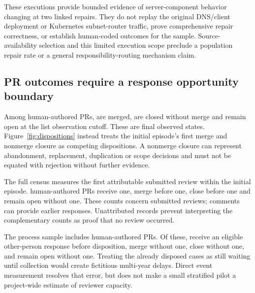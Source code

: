 \documentclass[11pt]{article}
\begin{document}
\begin{table}[htb]
\centering\small
\caption{Component regression oracles on official parent and repair commits.
Failure means the specified expected behavior was violated. The two control
results in each row correspond to parent and repair; both pass.}
\label{tab:repairvalidation}
\end{table}

These executions provide bounded evidence of server-component behavior changing
at two linked repairs. They do not replay the original DNS/client deployment
or Kubernetes subnet-router traffic, prove comprehensive repair correctness,
or establish human-coded outcomes for the sample. Source-availability selection
and this limited execution scope preclude a population repair rate or a general
responsibility-routing mechanism claim.

\subsection{PR outcomes require a response opportunity boundary}
Among human-authored PRs, \HumanPRMerged{} are merged,
\HumanPRUnmergedClosed{} are closed without merge and \HumanPROpen{} remain
open at the list observation cutoff. These are final observed states.
Figure~\ref{fig:dispositions} instead treats the initial episode's first merge
and nonmerge closure as competing dispositions. A nonmerge closure can represent
abandonment, replacement, duplication or scope decisions and must not be equated
with rejection without further evidence.

The full census measures the first attributable submitted review within the
initial episode. \FirstFormalReviewCount{} human-authored PRs receive one,
\FirstFormalMergeNoReview{} merge before one, \FirstFormalCloseNoReview{}
close before one and \FirstFormalOpenNoReview{} remain open without one.
These counts concern submitted reviews; comments can provide earlier responses.
Unattributed records prevent interpreting the complementary counts as proof that
no review occurred.

The process sample includes \PilotHumanPRCount{} human-authored PRs. Of these,
\PilotResponseCount{} receive an eligible other-person response before disposition,
\PilotMergeNoResponse{} merge without one, \PilotCloseNoResponse{} close without
one, and \PilotNoResponseOpen{} remain open without one. Treating the already
disposed cases as still waiting until collection would create fictitious
multi-year delays. Direct event measurement resolves that error, but does not
make a small stratified pilot a project-wide estimate of reviewer capacity.
\end{document}
